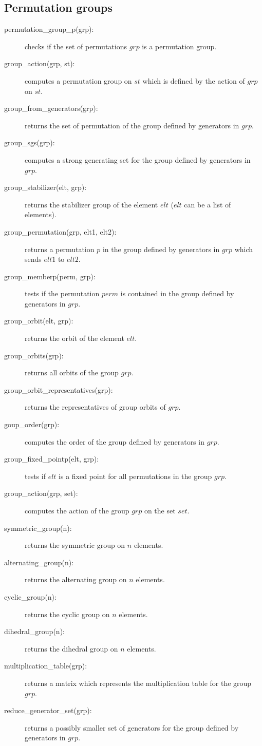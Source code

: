 \documentclass[11pt]{article}
\begin{document}
\subsection{Permutation groups}

\begin{description}
  \item [permutation\_group\_p(grp):] checks if the set of
    permutations $grp$ is a permutation group.
  \item [group\_action(grp, st):] computes a permutation group on $st$
    which is defined by the action of $grp$ on $st$.
  \item [group\_from\_generators(grp):] returns the set of permutation
    of the group defined by generators in $grp$.
  \item [group\_sgs(grp):] computes a strong generating set for the
    group defined by generators in $grp$.
  \item [group\_stabilizer(elt, grp):] returns the stabilizer group of
    the element $elt$ ($elt$ can be a list of elements).
  \item [group\_permutation(grp, elt1, elt2):] returns a permutation
    $p$ in the group defined by generators in $grp$ which sends $elt1$
    to $elt2$.
  \item [group\_memberp(perm, grp):] tests if the permutation $perm$
    is contained in the group defined by generators in $grp$.
  \item [group\_orbit(elt, grp):] returns the orbit of the element $elt$.
  \item [group\_orbits(grp):] returns all orbits of the group $grp$.
  \item [group\_orbit\_representatives(grp):] returns the
    representatives of group orbits of $grp$.
  \item [goup\_order(grp):] computes the order of the group defined by
    generators in $grp$.
  \item [group\_fixed\_pointp(elt, grp):] tests if $elt$ is a fixed
    point for all permutations in the group $grp$.
  \item [group\_action(grp, set):] computes the action of the group
    $grp$ on the set $set$.
  \item [symmetric\_group(n):] returns the symmetric group on $n$
    elements.
  \item [alternating\_group(n):] returns the alternating group on $n$
    elements.
  \item [cyclic\_group(n):] returns the cyclic group on $n$ elements.
  \item [dihedral\_group(n):] returns the dihedral group on $n$
    elements.
  \item [multiplication\_table(grp):] returns a matrix which
    represents the multiplication table for the group $grp$.
  \item [reduce\_generator\_set(grp):] returns a possibly smaller set
    of generators for the group defined by generators in $grp$.
\end{description}
\end{document}
